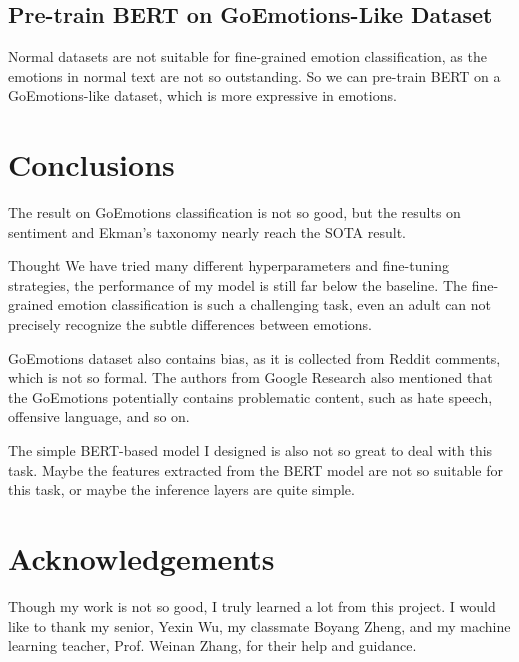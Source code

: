 \documentclass{article}
\begin{document}
\subsection{Pre-train BERT on GoEmotions-Like Dataset}

Normal datasets are not suitable for fine-grained emotion classification, as the emotions in normal text are not so outstanding. So we can pre-train BERT on a GoEmotions-like dataset, which is more expressive in emotions.

\section{Conclusions}

The result on GoEmotions classification is not so good, but the results on sentiment and Ekman's taxonomy nearly reach the SOTA result.

Thought We have tried many different hyperparameters and fine-tuning strategies, the performance of my model is still far below the baseline. The fine-grained emotion classification is such a challenging task, even an adult can not precisely recognize the subtle differences between emotions.

GoEmotions dataset also contains bias, as it is collected from Reddit comments, which is not so formal. The authors from Google Research also mentioned that the GoEmotions potentially contains problematic content, such as hate speech, offensive language, and so on.

The simple BERT-based model I designed is also not so great to deal with this task. Maybe the features extracted from the BERT model are not so suitable for this task, or maybe the inference layers are quite simple.

\section*{Acknowledgements}

Though my work is not so good, I truly learned a lot from this project. I would like to thank my senior, Yexin Wu, my classmate Boyang Zheng, and my machine learning teacher, Prof. Weinan Zhang, for their help and guidance.

\medskip










\end{document}
